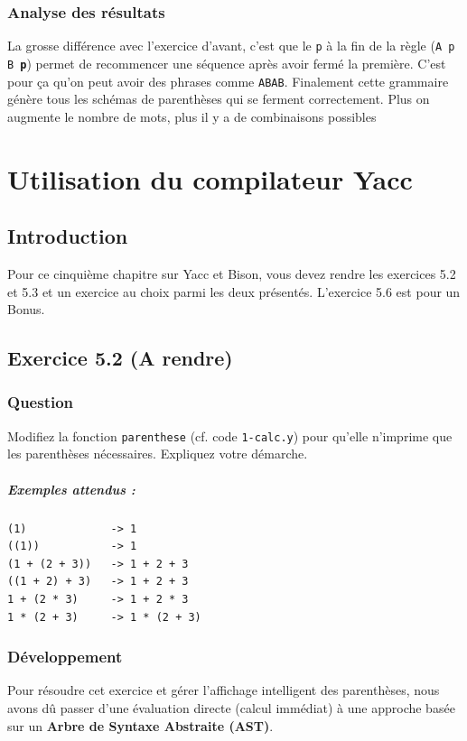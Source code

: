 \subsection{Analyse des résultats}

La grosse différence avec l'exercice d'avant, c'est que le \texttt{p} à la fin de la règle (\texttt{A p B \textbf{p}}) permet de recommencer une séquence après avoir fermé la première. C'est pour ça qu'on peut avoir des phrases comme \texttt{ABAB}. 
Finalement cette grammaire génère tous les schémas de parenthèses qui se ferment correctement. Plus on augmente le nombre de mots, plus il y a de combinaisons possibles

\chapter{Utilisation du compilateur Yacc}
\section*{Introduction}
Pour ce cinquième chapitre sur Yacc et Bison, vous devez rendre les exercices 5.2 et 5.3 et un exercice au choix parmi les deux présentés. L’exercice
5.6 est pour un Bonus.

\section {Exercice 5.2 (A rendre)}
\subsection{Question}
Modifiez la fonction \texttt{parenthese} (cf. code \texttt{1-calc.y}) pour qu’elle n’imprime que les parenthèses nécessaires. Expliquez votre démarche.

\paragraph{Exemples attendus :}
\begin{verbatim}
(1)             -> 1
((1))           -> 1
(1 + (2 + 3))   -> 1 + 2 + 3
((1 + 2) + 3)   -> 1 + 2 + 3
1 + (2 * 3)     -> 1 + 2 * 3
1 * (2 + 3)     -> 1 * (2 + 3)
\end{verbatim}

\subsection{Développement}  
Pour résoudre cet exercice et gérer l'affichage intelligent des parenthèses, nous avons dû passer d'une évaluation directe (calcul immédiat) à une approche basée sur un \textbf{Arbre de Syntaxe Abstraite (AST)}. 

